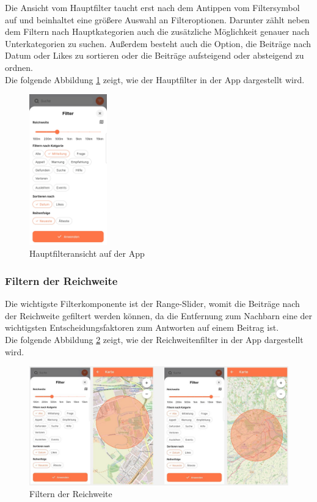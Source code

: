 Die Ansicht vom Hauptfilter taucht erst nach dem Antippen vom Filtersymbol auf und beinhaltet eine größere Auswahl an Filteroptionen. Darunter zählt neben dem Filtern nach Hauptkategorien auch die zusätzliche Möglichkeit genauer nach Unterkategorien zu suchen. Außerdem besteht auch die Option, die Beiträge nach Datum oder Likes zu sortieren oder die Beiträge aufsteigend oder absteigend zu ordnen.
\\
Die folgende Abbildung \ref{fig:main-filter} zeigt, wie der Hauptfilter in der App dargestellt wird.

\begin{figure}[h]
  \centering
  \includegraphics[width=0.3\textwidth]{pics/main-filter.jpg}
  \caption{Hauptfilteransicht auf der App}
  \label{fig:main-filter}
\end{figure}

\subsubsection{Filtern der Reichweite}

Die wichtigste Filterkomponente ist der Range-Slider, womit die Beiträge nach der Reichweite gefiltert werden können, da die Entfernung zum Nachbarn eine der wichtigsten Entscheidungsfaktoren zum Antworten auf einem Beitrag ist.
\\
Die folgende Abbildung \ref{fig:range-filter} zeigt, wie der Reichweitenfilter in der App dargestellt wird.

\begin{figure}[h]
  \centering
  \includegraphics[width=\textwidth]{pics/range-filter.JPG}
  \caption{Filtern der Reichweite}
  \label{fig:range-filter}
\end{figure}

